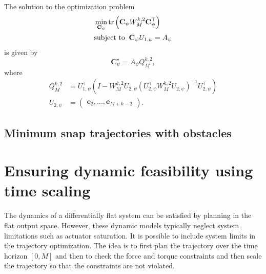 \begin{theorem}
	The solution to the optimization problem
	\begin{equation}
		\label{eq:min_snap_no_obstacles_heading}
		\begin{aligned}
		&\min_{\mathbf{C}_\psi} \trace{\mathbf{C}_\psi W_M^{k,2} \mathbf{C}_\psi^\top} \\
		&\text{subject to } \: \mathbf{C}_\psi U_{1,\psi} = A_\psi
		\end{aligned}
	\end{equation}
	is given by
	\begin{equation}
		\mathbf{C}_\psi^\star  = A_\psi Q_M^{k,2} ,
	\end{equation}
	where
	\begin{align*}
	Q_M^{k,2} &= U_{1,\psi}^\top \left(I-W_M^{k,2}U_{2,\psi}(U_{2,\psi}^\top W_M^{k,2} U_{2,\psi})^{-1}U_{2,\psi}^\top\right) \\
	U_{2,\psi} &= \begin{pmatrix} \mathbf{e}_2, \dots, \mathbf{e}_{M+k-2} \end{pmatrix}.
	\end{align*}
\end{theorem}

\subsection{Minimum snap trajectories with obstacles}



\section{Ensuring dynamic feasibility using time scaling}
The dynamics of a differentially flat system can be satisfied by planning in the flat output space. 
However, these dynamic models typically neglect system limitations such as actuator saturation. 
It is possible to include system limits in the trajectory optimization. The idea is to first plan the trajectory over the time horizon $[0,M]$ and then to check the force and torque constraints and then scale the trajectory so that the constraints are not violated.  

